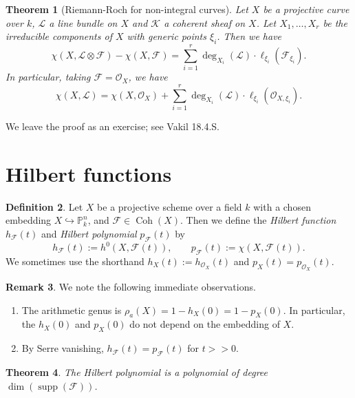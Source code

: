 \documentclass[10pt]{article}
\newtheorem{thm}{Theorem}[section]
\newtheorem{prop}[thm]{Proposition}
\theoremstyle{definition}
\newtheorem{defn}[thm]{Definition}
\newtheorem{rmk}[thm]{Remark}
\DeclareMathOperator{\supp}{supp}
\DeclareMathOperator{\Coh}{Coh}
\newcommand{\mf}{\mathfrak}
\newcommand{\PP}{\mathbb{P}}
\newcommand{\OO}{\mathcal{O}}
\newcommand{\LL}{\mathcal{L}}
\begin{document}

\begin{thm}[Riemann-Roch for non-integral curves]
Let $X$ be a projective curve over $k$, $\LL$ a line bundle on $X$ and $\mathcal{K}$ a coherent sheaf on $X$.  Let $X_1, \ldots, X_r$ be the irreducible components of $X$ with generic points $\xi_i$.  Then we have
$$\chi(X, \mathcal{L} \otimes \mathcal{F}) - \chi(X, \mathcal{F}) = \sum_{i=1}^r \deg_{X_i}(\mathcal{L}) \cdot \ell_{\xi_i}(\mathcal{F}_{\xi_i}).$$
In particular, taking $\mathcal{F} = \OO_X$, we have
$$\chi(X, \mathcal{L}) = \chi(X, \OO_X)+ \sum_{i=1}^r \deg_{X_i}(\mathcal{L}) \cdot \ell_{\xi_i}(\OO_{X, \xi_i}).$$
\end{thm}
We leave the proof as an exercise; see Vakil 18.4.S.

\newpage

\section{Hilbert functions}

\begin{defn}
Let $X$ be a projective scheme over a field $k$ with a chosen embedding $X \hookrightarrow \PP^n_k$, and $\mathcal{F} \in \Coh(X)$.  Then we define the \emph{Hilbert function} $h_{\mathcal{F}}(t)$ and \emph{Hilbert polynomial} $p_{\mathcal{F}}(t)$ by
$$h_{\mathcal{F}}(t) := h^0(X, \mathcal{F}(t)), \;\;\;\;\;\;\; p_{\mathcal{F}}(t) := \chi(X, \mathcal{F}(t)).$$
We sometimes use the shorthand $h_X(t) := h_{\OO_X}(t)$ and $p_X(t) = p_{\OO_X}(t)$.
\end{defn}


\begin{rmk}
We note the following immediate observations.
\begin{enumerate}
\item The arithmetic genus is $\rho_a(X) = 1 - h_X(0) = 1 - p_X(0)$.  In particular, the $h_X(0)$ and $p_X(0)$ do not depend on the embedding of $X$.
\item By Serre vanishing, $h_{\mathcal{F}}(t) = p_{\mathcal{F}}(t)$ for $t >> 0$.
\end{enumerate}
\end{rmk}

\begin{thm}
The Hilbert polynomial is a polynomial of degree $\dim(\supp(\mathcal{F}))$.
\end{thm}
\end{document}
